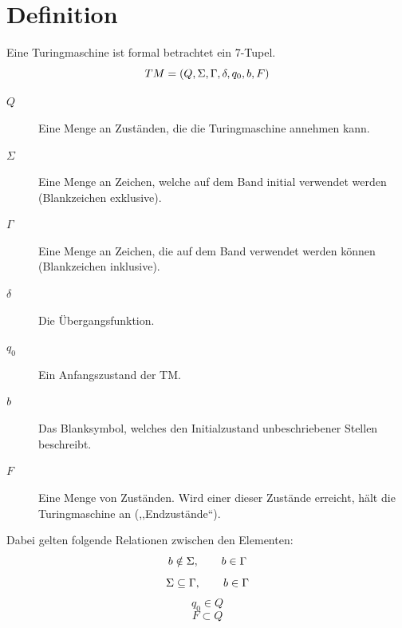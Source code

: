\section{Definition}
%
Eine Turingmaschine ist formal betrachtet ein 7-Tupel.
\begin{equation}
  TM = (Q, \Sigma, \Gamma, \delta, q_0, b, F)
\end{equation}
%
\begin{description}
 \item[$Q$] Eine Menge an Zuständen, die die Turingmaschine annehmen kann.
 \item[$\Sigma$] Eine Menge an Zeichen, welche auf dem Band initial verwendet werden (Blankzeichen exklusive).
 \item[$\Gamma$] Eine Menge an Zeichen, die auf dem Band verwendet werden können (Blankzeichen inklusive).
 \item[$\delta$] Die Übergangsfunktion.
 \item[$q_0$] Ein Anfangszustand der TM.
 \item[$b$] Das Blanksymbol, welches den Initialzustand unbeschriebener Stellen beschreibt.
 \item[$F$] Eine Menge von Zuständen. Wird einer dieser Zustände erreicht, hält die Turingmaschine an (,,Endzustände``).
\end{description}
%
Dabei gelten folgende Relationen zwischen den Elementen:
\begin{equation}
  b \notin \Sigma,  \hspace{20pt}  b \in \Gamma
\end{equation}
\begin{equation}
  \Sigma \subseteq \Gamma,  \hspace{20pt}  b \in \Gamma
\end{equation}
\begin{equation}
  q_0 \in Q
\end{equation}
\begin{equation}
  F \subset Q
\end{equation}

